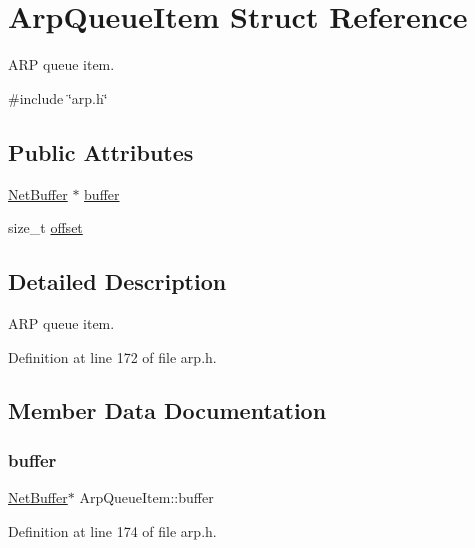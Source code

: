 \hypertarget{structArpQueueItem}{}\section{Arp\+Queue\+Item Struct Reference}
\label{structArpQueueItem}


A\+RP queue item.  




{\ttfamily \#include \char`\"{}arp.\+h\char`\"{}}

\subsection*{Public Attributes}
\begin{DoxyCompactItemize}
\item 
\hyperlink{structNetBuffer}{Net\+Buffer} $\ast$ \hyperlink{structArpQueueItem_a825a97f1d1ae622ab44e78cae03c86eb}{buffer}
\item 
size\+\_\+t \hyperlink{structArpQueueItem_af508c934293030681a6e12fcc41f3e3c}{offset}
\end{DoxyCompactItemize}


\subsection{Detailed Description}
A\+RP queue item. 

Definition at line 172 of file arp.\+h.



\subsection{Member Data Documentation}
\mbox{\label{structArpQueueItem_a825a97f1d1ae622ab44e78cae03c86eb}} 
\subsubsection{\texorpdfstring{buffer}{buffer}}
{\footnotesize\ttfamily \hyperlink{structNetBuffer}{Net\+Buffer}$\ast$ Arp\+Queue\+Item\+::buffer}



Definition at line 174 of file arp.\+h.

\mbox{\label{structArpQueueItem_af508c934293030681a6e12fcc41f3e3c}} 
